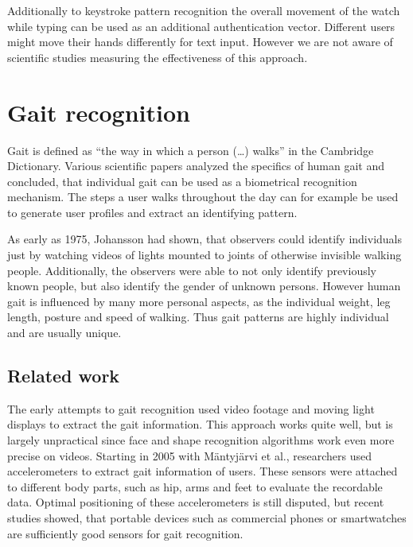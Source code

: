 Additionally to keystroke pattern recognition the overall movement of the watch while typing can be used as an additional authentication vector. Different users might move their hands differently for text input. However we are not aware of scientific studies measuring the effectiveness of this approach.

\section{Gait recognition}
Gait is defined as ``the way in which a person (…) walks'' in the Cambridge Dictionary. Various scientific papers analyzed the specifics of human gait\cite{johansson1975visual, lee2002gait, johnstonsmartwatch} and concluded, that individual gait can be used as a biometrical recognition mechanism. The steps a user walks throughout the day can for example be used to generate user profiles and extract an identifying pattern. 

As early as 1975, Johansson\cite{johansson1975visual} had shown, that observers could identify individuals just by watching videos of lights mounted to joints of otherwise invisible walking people. Additionally, the observers were able to not only identify previously known people, but also identify the gender of unknown persons. However human gait is influenced by many more personal aspects, as the individual weight, leg length, posture and speed of walking. Thus gait patterns are highly individual and are usually unique.
\subsection{Related work}
The early attempts to gait recognition used video footage and moving light displays to extract the gait information. This approach works quite well, but is largely unpractical since face and shape recognition algorithms work even more precise on videos. Starting in 2005 with Mäntyjärvi et al.\cite{mantyjarvi2005identifying}, researchers used accelerometers to extract gait information of users. These sensors were attached to different body parts, such as hip, arms and feet to evaluate the recordable data. Optimal positioning of these accelerometers is still disputed, but recent studies showed, that portable devices such as commercial phones\cite{derawi2013gait} or smartwatches\cite{johnstonsmartwatch} are sufficiently good sensors for gait recognition.

